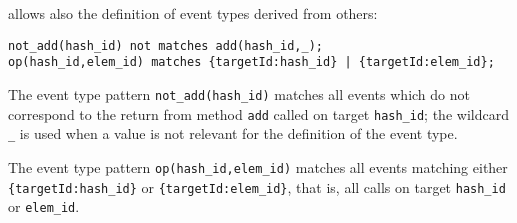 


\rml allows also the definition of event types derived from others:

\begin{lstlisting}[basicstyle=\ttfamily\footnotesize]
not_add(hash_id) not matches add(hash_id,_);
op(hash_id,elem_id) matches {targetId:hash_id} | {targetId:elem_id};
\end{lstlisting}  
The event type pattern \lstinline{not_add(hash_id)} matches all events which do not correspond to the return from
method \lstinline{add} called on target \lstinline{hash_id}; the wildcard \lstinline!_! is used when a value is not relevant for
the definition of the event type.

The event type pattern \lstinline{op(hash_id,elem_id)} matches all events matching either \lstinline!{targetId:hash_id}! or
\lstinline!{targetId:elem_id}!, that is, all calls on target \lstinline{hash_id} or \lstinline{elem_id}.

